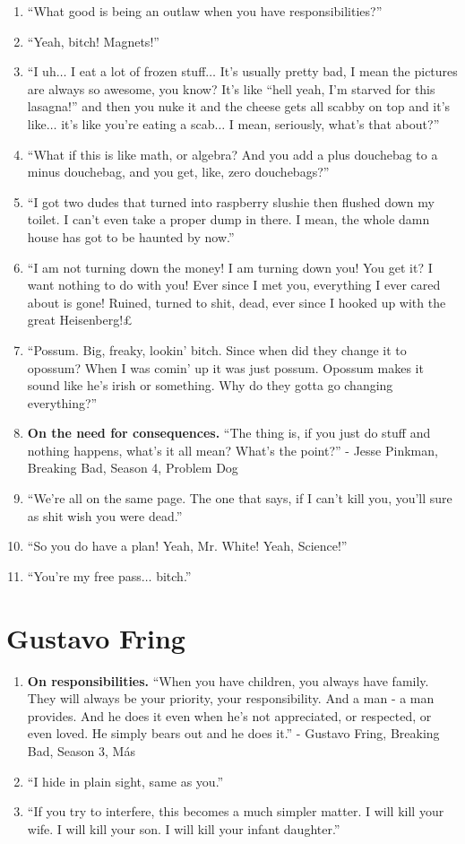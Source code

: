 \documentclass{book}
\numberwithin{equation}{section}
\begin{document}
\begin{enumerate}
    \item ``What good is being an outlaw when you have responsibilities?''
    \item ``Yeah, bitch! Magnets!''
    \item ``I uh$\ldots$ I eat a lot of frozen stuff$\ldots$ It's usually pretty bad, I mean the pictures are always so awesome, you know? It's like ``hell yeah, I'm starved for this lasagna!'' and then you nuke it and the cheese gets all scabby on top and it's like$\ldots$ it's like you're eating a scab$\ldots$ I mean, seriously, what's that about?''
    \item ``What if this is like math, or algebra? And you add a plus douchebag to a minus douchebag, and you get, like, zero douchebags?''
    \item ``I got two dudes that turned into raspberry slushie then flushed down my toilet. I can't even take a proper dump in there. I mean, the whole damn house has got to be haunted by now.''
    \item ``I am not turning down the money! I am turning down you! You get it? I want nothing to do with you! Ever since I met you, everything I ever cared about is gone! Ruined, turned to shit, dead, ever since I hooked up with the great Heisenberg!£
    \item ``Possum. Big, freaky, lookin' bitch. Since when did they change it to opossum? When I was comin' up it was just possum. Opossum makes it sound like he's irish or something. Why do they gotta go changing everything?''
    \item \textbf{On the need for consequences.} ``The thing is, if you just do stuff and nothing happens, what's it all mean? What's the point?'' - Jesse Pinkman, Breaking Bad, Season 4, Problem Dog
    \item ``We're all on the same page. The one that says, if I can't kill you, you'll sure as shit wish you were dead.''
    \item ``So you do have a plan! Yeah, Mr. White! Yeah, Science!''
    \item ``You're my free pass$\ldots$ bitch.''
\end{enumerate}

\section{Gustavo Fring}
\begin{enumerate}
    \item \textbf{On responsibilities.} ``When you have children, you always have family. They will always be your priority, your responsibility. And a man - a man provides. And he does it even when he's not appreciated, or respected, or even loved. He simply bears out and he does it.'' - Gustavo Fring, Breaking Bad, Season 3, Más
    \item ``I hide in plain sight, same as you.''
    \item ``If you try to interfere, this becomes a much simpler matter. I will kill your wife. I will kill your son. I will kill your infant daughter.''
\end{enumerate}
\end{document}
